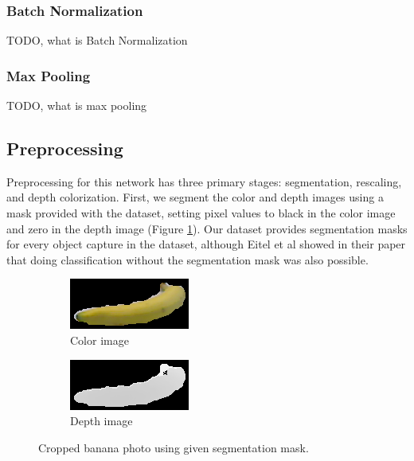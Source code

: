 \subsubsection{Batch Normalization}
TODO, what is Batch Normalization

\subsubsection{Max Pooling}
TODO, what is max pooling




\subsection{Preprocessing}
\label{subsec:preprocessing}
Preprocessing for this network has three primary stages: segmentation, rescaling, and depth colorization. First, we segment the color and depth images using a mask provided with the dataset, setting pixel values to black in the color image and zero in the depth image (Figure \ref{fig:img_cropped}). Our dataset provides segmentation masks for every object capture in the dataset, although Eitel et al \cite{Eitel2015} showed in their paper that doing classification without the segmentation mask was also possible.

\begin{figure}[htbp]
	\centering
	\begin{subfigure}[b]{0.45\linewidth}
		\includegraphics[width=\textwidth]{img/banana_1_1_1_crop.png}
		\caption{Color image}
	\end{subfigure}   	
	\begin{subfigure}[b]{0.45\linewidth}
		\includegraphics[width=\textwidth]{img/banana_1_1_1_depth_crop.png}
		\caption{Depth image}
	\end{subfigure}
	\caption{Cropped banana photo using given segmentation mask.}
	\label{fig:img_cropped}
\end{figure}

